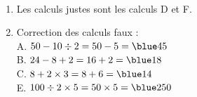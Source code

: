    \ \\ [-5mm]
   \begin{enumerate}
      \item Les calculs justes sont les calculs {\blue D} et {\blue F}. \smallskip
      \item Correction des calculs faux : \\
         A. $50-10\div2 =50-5 ={\blue 45}$ \\ [1mm]
         B. $24-8+2 =16+2 ={\blue 18}$ \\ [1mm]
         C. $8+2\times3 =8+6 ={\blue 14}$ \\ [1mm]
         E. $100\div2\times5 =50\times5 = {\blue 250}$
   \end{enumerate}
